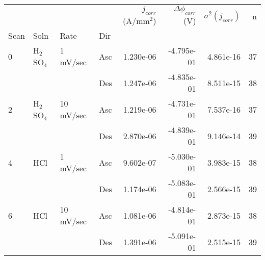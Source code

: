 \begin{tabular}{llllrrrr}
\toprule
  &     &           &     &  $j_{corr}$ (A/mm$^2$) &  $\Delta \phi_{corr}$ (V) &  $\sigma^2(j_{corr})$ &   n \\
Scan & Soln & Rate & Dir &                        &                           &                       &     \\
\midrule
0 & H$_2$SO$_4$ & 1 mV/sec & Asc &              1.230e-06 &                -4.795e-01 &             4.861e-16 &  37 \\
  &     &           & Des &              1.247e-06 &                -4.835e-01 &             8.511e-15 &  38 \\
2 & H$_2$SO$_4$ & 10 mV/sec & Asc &              1.219e-06 &                -4.731e-01 &             7.537e-16 &  37 \\
  &     &           & Des &              2.870e-06 &                -4.839e-01 &             9.146e-14 &  39 \\
4 & HCl & 1 mV/sec & Asc &              9.602e-07 &                -5.030e-01 &             3.983e-15 &  38 \\
  &     &           & Des &              1.174e-06 &                -5.083e-01 &             2.566e-15 &  39 \\
6 & HCl & 10 mV/sec & Asc &              1.081e-06 &                -4.814e-01 &             2.873e-15 &  38 \\
  &     &           & Des &              1.391e-06 &                -5.091e-01 &             2.515e-15 &  39 \\
\bottomrule
\end{tabular}
